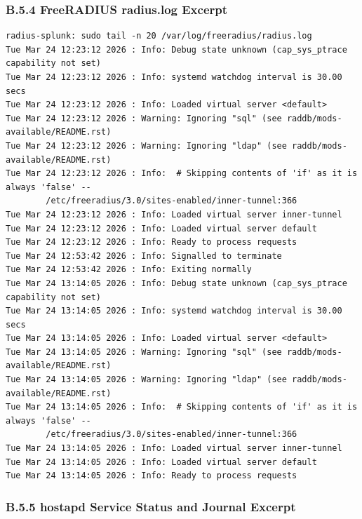 \documentclass[11pt]{article}
\begin{document}
\subsubsection{B.5.4 FreeRADIUS radius.log Excerpt}
\label{sec:appendix-b-freeradius-radius-log-excerpt}

\begin{verbatim}
radius-splunk: sudo tail -n 20 /var/log/freeradius/radius.log
Tue Mar 24 12:23:12 2026 : Info: Debug state unknown (cap_sys_ptrace capability not set)
Tue Mar 24 12:23:12 2026 : Info: systemd watchdog interval is 30.00 secs
Tue Mar 24 12:23:12 2026 : Info: Loaded virtual server <default>
Tue Mar 24 12:23:12 2026 : Warning: Ignoring "sql" (see raddb/mods-available/README.rst)
Tue Mar 24 12:23:12 2026 : Warning: Ignoring "ldap" (see raddb/mods-available/README.rst)
Tue Mar 24 12:23:12 2026 : Info:  # Skipping contents of 'if' as it is always 'false' --
        /etc/freeradius/3.0/sites-enabled/inner-tunnel:366
Tue Mar 24 12:23:12 2026 : Info: Loaded virtual server inner-tunnel
Tue Mar 24 12:23:12 2026 : Info: Loaded virtual server default
Tue Mar 24 12:23:12 2026 : Info: Ready to process requests
Tue Mar 24 12:53:42 2026 : Info: Signalled to terminate
Tue Mar 24 12:53:42 2026 : Info: Exiting normally
Tue Mar 24 13:14:05 2026 : Info: Debug state unknown (cap_sys_ptrace capability not set)
Tue Mar 24 13:14:05 2026 : Info: systemd watchdog interval is 30.00 secs
Tue Mar 24 13:14:05 2026 : Info: Loaded virtual server <default>
Tue Mar 24 13:14:05 2026 : Warning: Ignoring "sql" (see raddb/mods-available/README.rst)
Tue Mar 24 13:14:05 2026 : Warning: Ignoring "ldap" (see raddb/mods-available/README.rst)
Tue Mar 24 13:14:05 2026 : Info:  # Skipping contents of 'if' as it is always 'false' -- 
        /etc/freeradius/3.0/sites-enabled/inner-tunnel:366
Tue Mar 24 13:14:05 2026 : Info: Loaded virtual server inner-tunnel
Tue Mar 24 13:14:05 2026 : Info: Loaded virtual server default
Tue Mar 24 13:14:05 2026 : Info: Ready to process requests
\end{verbatim}


\subsubsection{B.5.5 hostapd Service Status and Journal Excerpt}
\label{sec:appendix-b-hostapd-service-status-and-journal-excerpt}
\end{document}
